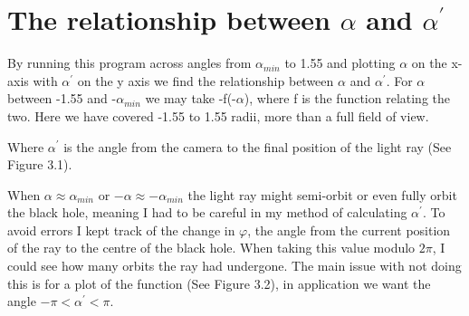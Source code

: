 \documentclass[oneside,openright,frontopenright]{dmathesis}
\begin{document}
\section{The relationship between $\alpha$ and $\alpha^{'}$}

	By running this program across angles from $\alpha_{min}$ to 1.55 and plotting $\alpha$ on the x-axis with $\alpha^{'}$ on the y axis we find the relationship between $\alpha$ and $\alpha^{'}$. For $\alpha$ between -1.55 and -$\alpha_{min}$ we may take -f(-$\alpha$), where f is the function relating the two. Here we have covered -1.55 to 1.55 radii, more than a full field of view.

	Where  $\alpha^{'}$ is the angle from the camera to the final position of the light ray (See Figure 3.1).

	When $\alpha \approx \alpha_{min}$ or $-\alpha \approx -\alpha_{min}$ the light ray might semi-orbit or even fully orbit the black hole, meaning I had to be careful in my method  of calculating $\alpha^{'}$. To avoid errors I kept track of the change in $\varphi$, the angle from the current position of the ray to the centre of the black hole. When taking this value modulo $2\pi$, I could see how many orbits the ray had undergone. The main issue with not doing this is for a plot of the function (See Figure 3.2), in application we want the angle $-\pi<\alpha^{'}<\pi$.
\end{document}
